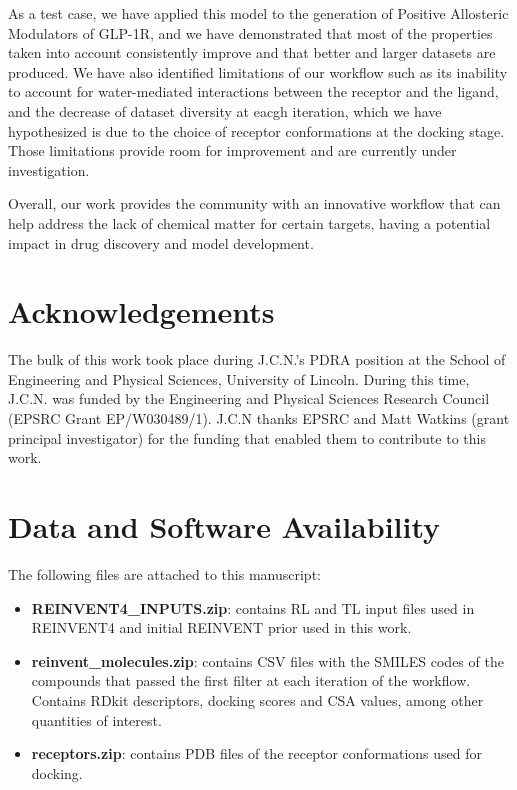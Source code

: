 \documentclass[letterpaper]{article}
\begin{document}
As a test case, we have applied this model to the generation of Positive Allosteric Modulators of GLP-1R, and we have demonstrated that most of the properties taken into account consistently improve and that better and larger datasets are produced. We have also identified limitations of our workflow such as its inability to account for water-mediated interactions between the receptor and the ligand, and the decrease of dataset diversity at eacgh iteration, which we have hypothesized is due to the choice of receptor conformations at the docking stage. Those limitations provide room for improvement and are currently under investigation.

Overall, our work provides the community with an innovative workflow that can help address the lack of chemical matter for certain targets, having a potential impact in drug discovery and model development.

\section*{Acknowledgements}

The bulk of this work took place during J.C.N.'s PDRA position at the School of Engineering and Physical Sciences, University of Lincoln. During this time, J.C.N. was funded by the Engineering and Physical Sciences Research Council (EPSRC Grant EP/W030489/1). J.C.N thanks EPSRC and Matt Watkins (grant principal investigator) for the funding that enabled them to contribute to this work. 

\section*{Data and Software Availability}
The following files are attached to this manuscript:
\begin{itemize}
    \item \textbf{REINVENT4\_INPUTS.zip}: contains RL and TL input files used in REINVENT4 and initial REINVENT prior used in this work.
    \item \textbf{reinvent\_molecules.zip}: contains CSV files with the SMILES codes of the compounds that passed the first filter at each iteration of the workflow. Contains RDkit descriptors, docking scores and CSA values, among other quantities of interest.
    \item \textbf{receptors.zip}: contains PDB files of the receptor conformations used for docking.
\end{itemize}
\end{document}
